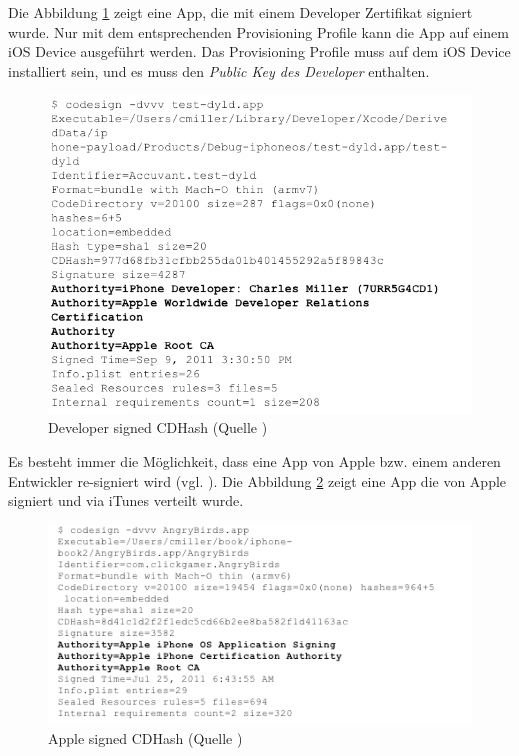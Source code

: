 Die Abbildung \ref{fig:Developer signed CDHash} zeigt eine App, die mit einem Developer Zertifikat signiert wurde. Nur mit dem entsprechenden Provisioning Profile kann die App auf einem iOS Device ausgeführt werden. Das Provisioning Profile muss auf dem iOS Device installiert sein, und es muss den \textit{\glqq Public Key des Developer\grqq{}} enthalten.\par 
\begin{figure}[!ht]
        \centering
        \includegraphics[scale=0.6]{developerZert-codesign-CDHash.png}
        \caption{Developer signed CDHash (Quelle \cite{Hacking[1]})}
        \label{fig:Developer signed CDHash}
\end{figure}

Es besteht immer die Möglichkeit, dass eine App von Apple bzw. einem anderen Entwickler re-signiert wird (vgl. \cite{Sign[1], Sign[2], Sign[3], Sign[4], Sign[5]}). Die Abbildung \ref{fig:Apple signed CDHash} zeigt eine App die von Apple signiert und via iTunes verteilt wurde.

\begin{figure}[!ht]
        \centering
        \includegraphics[scale=1.0]{AppleZert_CDHash.png}
        \caption{Apple signed CDHash (Quelle \cite{Hacking[1]})}
        \label{fig:Apple signed CDHash}
\end{figure}

